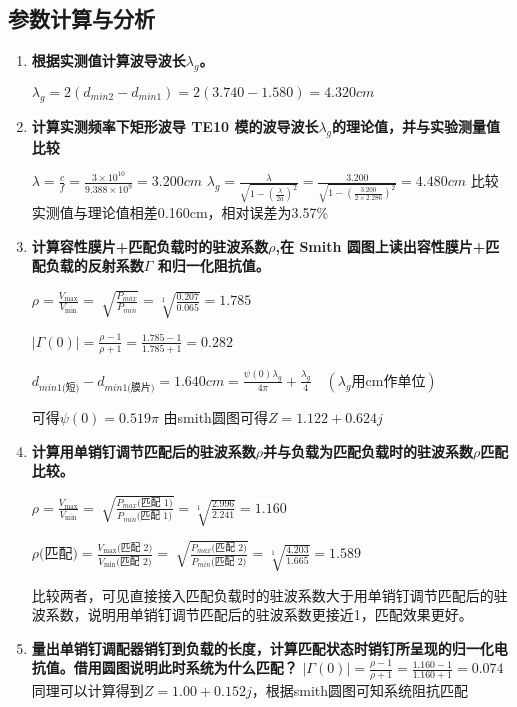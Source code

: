 \documentclass[12pt,hyperref,a4paper,UTF8]{ctexart}
\begin{document}
\subsection{参数计算与分析}

\begin{enumerate}
    \item \textbf{根据实测值计算波导波长$\lambda_g$。}
    
    $\lambda_g=2(d_{min2}-d_{min1})=2(3.740-1.580)=4.320cm$
    \item \textbf{计算实测频率下矩形波导 TE10 模的波导波长$\lambda_g$的理论值，并与实验测量值比较}
    
    $\lambda=\frac{c}{f} = \frac{3 \times 10^{10}}{9.388 \times 10^{9}} = 3.200cm$
    $\lambda_g= \frac{\lambda}{\sqrt{1-(\frac{\lambda}{2a})^{2}}} = \frac{3.200}{\sqrt{1-(\frac{3.200}{2 \times 2.286})^{2}}} = 4.480cm$
    比较实测值与理论值相差0.160cm，相对误差为3.57\%
    \item \textbf{计算容性膜片+匹配负载时的驻波系数$\rho$,在 Smith 圆图上读出容性膜片+匹配负载的反射系数$\Gamma$ 和归一化阻抗值。}
    
    $\rho=\frac{V_{\max}}{V_{\min}}=\sqrt[]{\frac{P_{max}}{P_{min}}}=\sqrt[1]{\frac{0.207}{0.065}}=1.785$

    $|\Gamma (0)| = \frac{\rho - 1}{\rho + 1} = \frac{1.785 - 1}{1.785 + 1} = 0.282$

    $d_{min1\text{(短)}}-d_{min1\text{(膜片)}}=1.640cm = \frac{\psi(0)\lambda_g}{4 \pi} + \frac{\lambda_g}{4} \quad (\lambda_g \text{用} \text{cm} \text{作单位})$

    可得$\psi(0)=0.519\pi $ 由smith圆图可得$Z=1.122+0.624j$

    \item \textbf{计算用单销钉调节匹配后的驻波系数$\rho$并与负载为匹配负载时的驻波系数$\rho$匹配比较。}
    
     $\rho=\frac{V_{\max}}{V_{\min}}=\sqrt[]{\frac{P_{max}\text{(匹配 1)}}{P_{min}\text{(匹配 1)}}}=\sqrt[1]{\frac{2.996}{2.241}}=1.160$

    $\rho\text{(匹配)}=\frac{V_{\max}\text{(匹配 2)}}{V_{\min}\text{(匹配 2)}}=\sqrt[]{\frac{P_{max}\text{(匹配 2)}}{P_{min}\text{(匹配 2)}}}=\sqrt[1]{\frac{4.203}{1.665}}=1.589$

    比较两者，可见直接接入匹配负载时的驻波系数大于用单销钉调节匹配后的驻波系数，说明用单销钉调节匹配后的驻波系数更接近1，匹配效果更好。
    \item \textbf{量出单销钉调配器销钉到负载的长度，计算匹配状态时销钉所呈现的归一化电抗值。借用圆图说明此时系统为什么匹配？}
    $|\Gamma (0)| = \frac{\rho - 1}{\rho + 1} = \frac{1.160 - 1}{1.160 + 1} = 0.074$
    同理可以计算得到$Z=1.00+0.152j$，根据smith圆图可知系统阻抗匹配

\end{enumerate}
\end{document}
